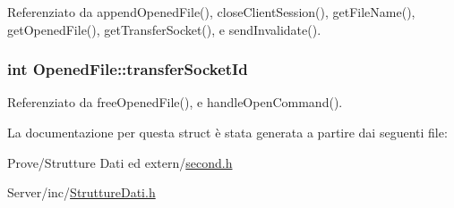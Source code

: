 Referenziato da append\+Opened\+File(), close\+Client\+Session(), get\+File\+Name(), get\+Opened\+File(), get\+Transfer\+Socket(), e send\+Invalidate().

\hypertarget{structOpenedFile_a2b10a150aba89a8d193cd251012682a7}{
\subsubsection[{transfer\+Socket\+Id}]{\setlength{\rightskip}{0pt plus 5cm}int Opened\+File\+::transfer\+Socket\+Id}}\label{structOpenedFile_a2b10a150aba89a8d193cd251012682a7}


Referenziato da free\+Opened\+File(), e handle\+Open\+Command().



La documentazione per questa struct è stata generata a partire dai seguenti file\+:\begin{DoxyCompactItemize}
\item 
Prove/\+Strutture Dati ed extern/\hyperlink{second_8h}{second.\+h}\item 
Server/inc/\hyperlink{StruttureDati_8h}{Strutture\+Dati.\+h}\end{DoxyCompactItemize}
